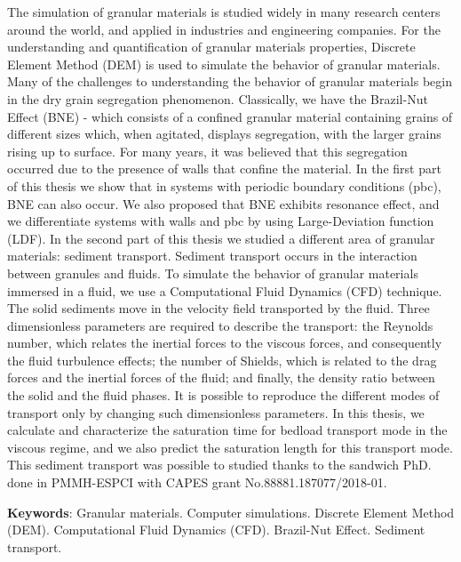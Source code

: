 
\begin{resumo}[Abstract]
    The simulation of granular materials is studied widely in many research centers around the world, and applied in industries and engineering companies. For the understanding and quantification of granular materials properties, Discrete Element Method (DEM) is used to simulate the behavior of granular materials.
    Many of the challenges to understanding the behavior of granular materials begin in the dry grain segregation phenomenon. Classically, we have the Brazil-Nut Effect (BNE) - which consists of a confined granular material containing grains of different sizes which, when agitated, displays segregation, with the larger grains rising up to surface. For many years, it was believed that this segregation occurred due to the presence of walls that confine the material. In the first part of this thesis we show that in systems with periodic boundary conditions (pbc), BNE can also occur. We also proposed that BNE exhibits resonance effect, and we differentiate systems with walls and pbc by using Large-Deviation function (LDF).
    In the second part of this thesis we studied a different area of granular materials: sediment transport. Sediment transport occurs in the interaction between granules and fluids. To simulate the behavior of granular materials immersed in a fluid, we use a Computational Fluid Dynamics (CFD) technique. The solid sediments move in the velocity field transported by the fluid. Three dimensionless parameters are required to describe the transport: the Reynolds number, which relates the inertial forces to the viscous forces, and consequently the fluid turbulence effects; the number of Shields, which is related to the drag forces and the inertial forces of the fluid; and finally, the density ratio between the solid and the fluid phases. It is possible to reproduce the different modes of transport only by changing such dimensionless parameters. In this thesis, we calculate and characterize the saturation time for bedload transport mode in the viscous regime, and we also predict the saturation length for this transport mode. This sediment transport was possible to studied thanks to the sandwich PhD. done in PMMH-ESPCI with CAPES grant No.88881.187077/2018-01.

    \textbf{Keywords}: Granular materials. Computer simulations. Discrete Element Method (DEM). Computational Fluid Dynamics (CFD). Brazil-Nut Effect. Sediment transport.
\end{resumo}


